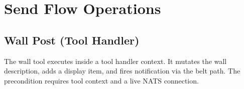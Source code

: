 \documentclass[a4paper,10pt,fleqn]{article}
\begin{document}
\section{Send Flow Operations}

\subsection{Wall Post (Tool Handler)}

The wall tool executes inside a tool handler context.  It
mutates the wall description, adds a display item, and fires
notification via the belt path.  The precondition requires
tool context and a live NATS connection.
\end{document}
